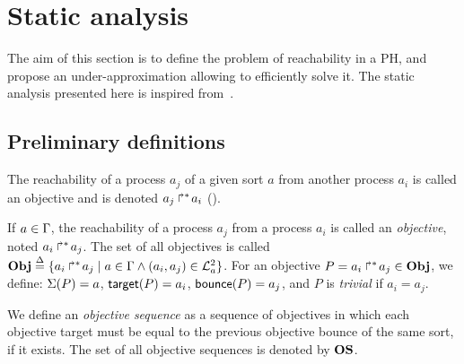 \section{Static analysis}\label{sec:sa}

The aim of this section is to define the problem of reachability in a PH,
and propose an under-approximation allowing to efficiently solve it.
The static analysis presented here is inspired from~\cite{PMR12-MSCS}.

\subsection{Preliminary definitions}
\label{ssec:sa-def}

The reachability of a process $a_j$ of a given sort $a$ from another process $a_i$ is called an objective and is denoted $\mbox{${a}_{j}\Rsh^*\!{a}_{i}$}$ ().
\begin{definition}
\label{def:obj}
  If $a \in \Gamma$, the reachability of a process $a_j$ from a process $a_i$ is called an \emph{objective}, noted $\mbox{$a_i\Rsh^*\!a_j$}$.
  The set of all objectives is called $\mathbf{Obj} \stackrel{\Delta}= \{ \mbox{$a_i\Rsh^*\!a_j$} \mid a \in \Gamma \wedge (a_i, a_j) \in \mathcal{L}_a^2 \}$.
  For an objective $P = \mbox{$a_i\Rsh^*\!a_j$} \in \mathbf{Obj}$, we define: $\Sigma(P) = a$, $\mathsf{target}(P)=a_i$, $\mathsf{bounce}(P)=a_j$,
  and $P$ is \emph{trivial} if $a_i = a_j$.

  We define an \emph{objective sequence} as a sequence of objectives in which each objective target must be equal to the previous objective bounce of the same sort, if it exists.
  The set of all objective sequences is denoted by $\mathbf{OS}$.
\end{definition}

